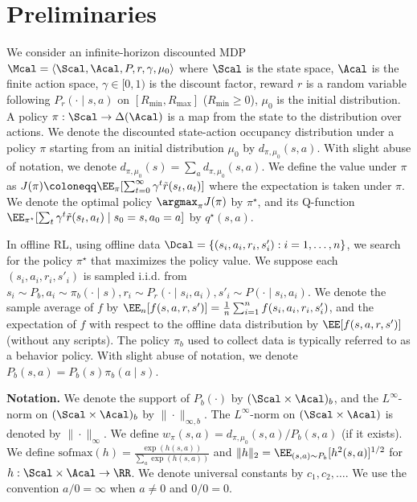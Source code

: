 
\section{Preliminaries}


We consider an infinite-horizon discounted MDP $\Mcal =\langle \Scal,\Acal, P,r,\gamma,\mu_0\rangle$ where $\Scal$ is the state space, $\Acal$ is the finite action space, $\gamma \in [0,1)$ is the discount factor, reward $r$ is a random variable following $P_r(\cdot \mid s,a)$ on $[R_{\min},R_{\max}]$ ($R_{\min}\geq 0$), $\mu_0$ is the initial distribution. A policy $\pi:\Scal \to \Delta(\Acal)$ is a map from the state to the distribution over actions. We denote the discounted state-action occupancy distribution under a policy $\pi$ starting from an initial distribution $\mu_0$ by $d_{\pi,\mu_0}(s,a)$. With slight abuse of notation, we denote $d_{\pi,\mu_0}(s)=\sum_a d_{\pi,\mu_0}(s,a)$. We define the value under $\pi$ as $J(\pi)\coloneqq \EE_{\pi}[\sum_{t=0}^{\infty} \gamma^t \tilde r(s_t,a_t)]$ where the expectation is taken under $\pi$. We denote the optimal policy $\argmax_{\pi} J(\pi)$ by $\pi^{\star}$, and its Q-function $\EE_{\pi^{\star}}[\sum_t \gamma^t \tilde r(s_t,a_t)\mid s_0=s,a_0=a] $ by $q^{\star}(s,a)$. 

In offline RL, using offline data $\Dcal=\{(s_i,a_i,r_i,s'_i):i=1,\dots,n\}$, we search for the policy $\pi^{\star}$ that maximizes the policy value. We suppose each $(s_i,a_i,r_i,s'_i)$ is sampled {i.i.d.} from $s_i\sim P_b, a_i\sim \pi_b(\cdot\mid s), r_i\sim P_r(\cdot \mid s_i,a_i),s'_i\sim P(\cdot \mid s_i,a_i)$. We denote the sample average of $f$ by $\EE_n[f(s,a,r,s')]=\frac1n\sum_{i=1}^nf(s_i,a_i,r_i,s'_i)$, and the expectation of $f$ with respect to the offline data distribution by $\EE[f(s,a,r,s')]$ (without any scripts). The policy $\pi_b$ used to collect data is typically referred to as a behavior policy. 
With slight abuse of notation, we denote $P_b(s,a)=P_b(s)\pi_b(a\mid s)$. %




\textbf{Notation.} 
We denote the support of $P_b(\cdot)$ by $(\Scal \times \Acal)_b$, and the $L^{\infty}$-norm on $(\Scal \times \Acal)_b$ by $\|\cdot\|_{\infty,b}$. 
The $L^{\infty}$-norm on $(\Scal \times \Acal)$ is denoted by $\|\cdot\|_{\infty}$. We define $w_{\pi}(s,a)=d_{\pi,\mu_0}(s,a)/P_b(s,a)$ (if it exists). We define $\mathrm{sofmax}(h)=\frac{\exp(h(s,a))}{\sum_a \exp(h(s,a))}$ and $\|h\|_2=\EE_{(s,a)\sim P_b}[h^2(s,a)]^{1/2}$ for $h:\Scal \times \Acal \to \RR$. We denote universal constants by $c_1,c_2,\dots$. We use the convention $a/0=\infty$ when $a\neq 0$ and $0/0=0$. 
